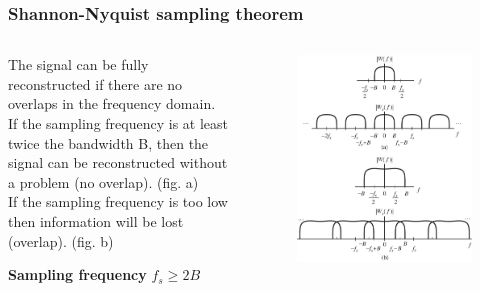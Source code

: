 \begin{frame}
	\frametitle{Shannon-Nyquist sampling theorem}
	\begin{columns}
		\begin{column}{0.5\textwidth}
		The signal can be fully reconstructed if there are no overlaps in the frequency domain.\\
		If the sampling frequency is at least twice the bandwidth B, then the signal can be reconstructed without a problem (no overlap). (fig. a)\\
		If the sampling frequency is too low then information will be lost (overlap). (fig. b)\\
		\begin{alertblock}{}
		\textbf{Sampling frequency} $f_s \geq 2 B$
		\end{alertblock}
		\end{column}
		\begin{column}{0.5\textwidth}
		\begin{figure}
			\includegraphics[width=0.9\linewidth]{nyquist}
		\end{figure}
		\end{column}
	\end{columns}
\end{frame}

